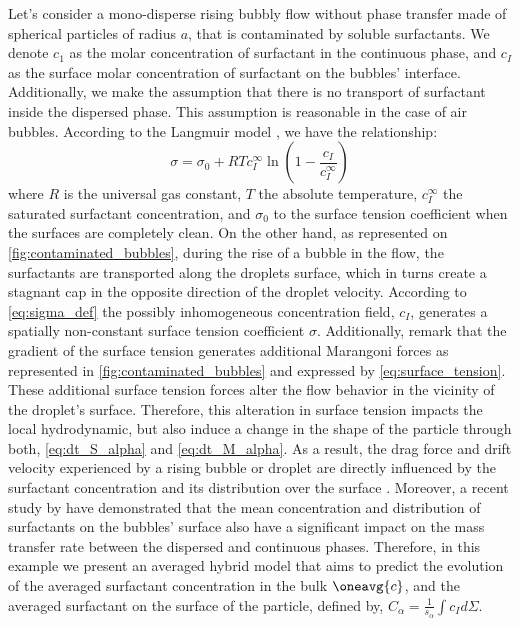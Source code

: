 Let's consider a mono-disperse rising bubbly flow without phase transfer made of spherical particles of radius $a$, that is contaminated by soluble surfactants.
We denote $c_1$ as the molar concentration of surfactant in the continuous phase, and $c_I$ as the surface molar concentration of surfactant on the bubbles' interface.
Additionally, we make the assumption that there is no transport of surfactant inside the dispersed phase. 
This assumption is reasonable in the case of air bubbles.
According to the Langmuir model \citep{pesci2018computational}, we have the relationship:
\begin{equation}
    \sigma
    = \sigma_0
    + RT c_I^\infty
    \ln\left(1-\frac{c_I}{c_I^\infty}\right)
    \label{eq:sigma_def}
\end{equation}
where $R$ is the universal gas constant, $T$ the absolute temperature, $c_I^\infty$ the saturated surfactant concentration, and $\sigma_0$ to the surface tension coefficient when the surfaces are completely clean.
On the other hand, as represented on \ref{fig:contaminated_bubbles}, during the rise of a bubble in the flow, the surfactants are transported along the droplets surface, which in turns create a stagnant cap in the opposite direction of the droplet velocity.
According to \ref{eq:sigma_def} the possibly inhomogeneous concentration field, $c_I$, generates a spatially non-constant surface tension coefficient $\sigma$.
Additionally, remark that the gradient of the surface tension generates additional Marangoni forces as represented in \ref{fig:contaminated_bubbles} and expressed by \ref{eq:surface_tension}.
These additional surface tension forces alter the flow behavior in the vicinity of the droplet's surface.
Therefore, this alteration in surface tension impacts the local hydrodynamic, but also induce a change in the shape of the particle through both, \ref{eq:dt_S_alpha} and \ref{eq:dt_M_alpha}.
As a result, the drag force and drift velocity experienced by a rising bubble or droplet are directly influenced by the surfactant concentration and its distribution over the surface \citep{pesci2018computational}.
Moreover, a recent study by \citet{kentheswaran2022direct} have demonstrated that the mean concentration and distribution of surfactants on the bubbles' surface also have a significant impact on the mass transfer rate between the dispersed and continuous phases.
Therefore, in this example we present an averaged hybrid model that aims to predict the evolution of the averaged surfactant concentration in the bulk $\oneavg{c}$, and the averaged surfactant on the surface of the particle, defined by, $C_{\alpha}= \frac{1}{s_\alpha}\int c_I d\Sigma$.
